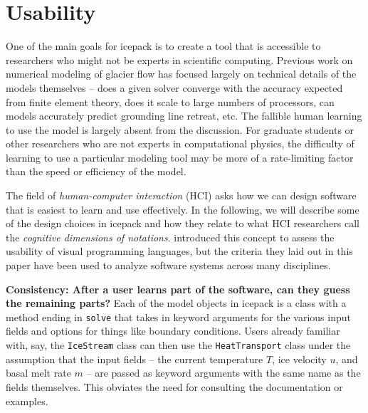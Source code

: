 \documentclass{article}
\theoremstyle{definition}
\theoremstyle{plain}
\begin{document}
\section{Usability}

One of the main goals for icepack is to create a tool that is accessible to researchers who might not be experts in scientific computing.
Previous work on numerical modeling of glacier flow has focused largely on technical details of the models themselves -- does a given solver converge with the accuracy expected from finite element theory, does it scale to large numbers of processors, can models accurately predict grounding line retreat, etc.
The fallible human learning to use the model is largely absent from the discussion.
For graduate students or other researchers who are not experts in computational physics, the difficulty of learning to use a particular modeling tool may be more of a rate-limiting factor than the speed or efficiency of the model.

The field of \emph{human-computer interaction} (HCI) asks how we can design software that is easiest to learn and use effectively.
In the following, we will describe some of the design choices in icepack and how they relate to what HCI researchers call the \emph{cognitive dimensions of notations}.
\citet{green1996usability} introduced this concept to assess the usability of visual programming languages, but the criteria they laid out in this paper have been used to analyze software systems across many disciplines.

\textbf{Consistency: After a user learns part of the software, can they guess the remaining parts?}
Each of the model objects in icepack is a class with a method ending in \texttt{solve} that takes in keyword arguments for the various input fields and options for things like boundary conditions.
Users already familiar with, say, the \texttt{IceStream} class can then use the \texttt{HeatTransport} class under the assumption that the input fields -- the current temperature $T$, ice velocity $u$, and basal melt rate $m$ -- are passed as keyword arguments with the same name as the fields themselves.
This obviates the need for consulting the documentation or examples.
\end{document}
